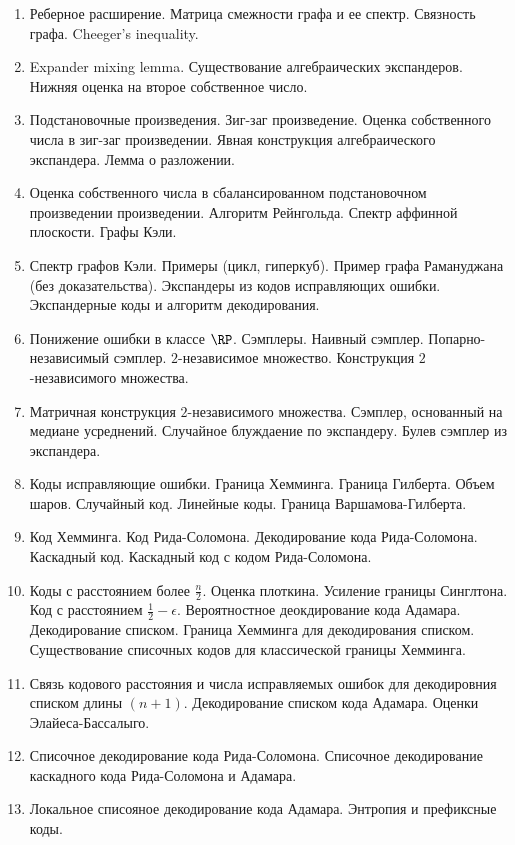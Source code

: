 \begin{enumerate}
    \item Реберное расширение. Матрица смежности графа и ее спектр. Связность графа. Cheeger's inequality.
    \item Expander mixing lemma. Существование алгебраических экспандеров. Нижняя оценка на второе собственное число.
    \item Подстановочные произведения. Зиг-заг произведение. Оценка собственного числа в зиг-заг произведении. Явная
        конструкция алгебраического экспандера. Лемма о разложении. 
    \item Оценка собственного числа в сбалансированном подстановочном произведении произведении. Алгоритм Рейнгольда. Спектр
        аффинной плоскости. Графы Кэли.
    \item Спектр графов Кэли. Примеры (цикл, гиперкуб). Пример графа Рамануджана (без доказательства). Экспандеры из кодов
        исправляющих ошибки. Экспандерные коды и алгоритм декодирования.
    \item Понижение ошибки в классе $\RP$. Сэмплеры. Наивный сэмплер. Попарно-независимый сэмплер. $2$-независимое
        множество. Конструкция $2$-независимого множества.
    \item Матричная конструкция $2$-независимого множества. Сэмплер, основанный на медиане усреднений. Случайное блуждаение
        по экспандеру. Булев сэмплер из экспандера.
    \item Коды исправляющие ошибки. Граница Хемминга. Граница Гилберта. Объем шаров. Случайный код. Линейные коды. Граница
        Варшамова-Гилберта.
    \item Код Хемминга. Код Рида-Соломона. Декодирование кода Рида-Соломона. Каскадный код. Каскадный код с кодом
        Рида-Соломона.
    \item Коды с расстоянием более $\frac{n}{2}$. Оценка плоткина. Усиление границы Синглтона. Код с расстоянием $\frac{1}{2}
        - \epsilon$. Вероятностное деокдирование кода Адамара. Декодирование списком. Граница Хемминга для декодирования
        списком. Существование списочных кодов для классической границы Хемминга.
	\item Связь кодового расстояния и числа исправляемых ошибок для декодировния списком длины $(n + 1)$. Декодирование
        списком кода Адамара. Оценки Элайеса-Бассалыго.
    \item Списочное декодирование кода Рида-Соломона. Списочное декодирование каскадного кода Рида-Соломона и Адамара.
    \item Локальное списояное декодирование кода Адамара. Энтропия и префиксные коды.
\end{enumerate}


